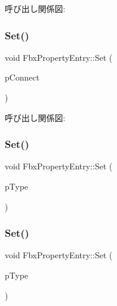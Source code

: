 呼び出し関係図\+:
\mbox{\label{class_fbx_property_entry_a454ced1ebe45eb69c62b9618a6c6f5e3}} 
\subsubsection{\texorpdfstring{Set()}{Set()}\hspace{0.1cm}{\footnotesize\ttfamily [3/5]}}
{\footnotesize\ttfamily void Fbx\+Property\+Entry\+::\+Set (\begin{DoxyParamCaption}\item[{\hyperlink{class_fbx_property_connect}{Fbx\+Property\+Connect} $\ast$}]{p\+Connect }\end{DoxyParamCaption})}

呼び出し関係図\+:
\mbox{\label{class_fbx_property_entry_a34f5e6c4048ed0519f6a74db1f341b2e}} 
\subsubsection{\texorpdfstring{Set()}{Set()}\hspace{0.1cm}{\footnotesize\ttfamily [4/5]}}
{\footnotesize\ttfamily void Fbx\+Property\+Entry\+::\+Set (\begin{DoxyParamCaption}\item[{\hyperlink{class_fbx_property_flags}{Fbx\+Property\+Flags}}]{p\+Type }\end{DoxyParamCaption})}

\mbox{\label{class_fbx_property_entry_ad0196c0a6783551c672a98a97450ad96}} 
\subsubsection{\texorpdfstring{Set()}{Set()}\hspace{0.1cm}{\footnotesize\ttfamily [5/5]}}
{\footnotesize\ttfamily void Fbx\+Property\+Entry\+::\+Set (\begin{DoxyParamCaption}\item[{\hyperlink{class_fbx_property_flags}{Fbx\+Property\+Flags} $\ast$}]{p\+Type }\end{DoxyParamCaption})}




